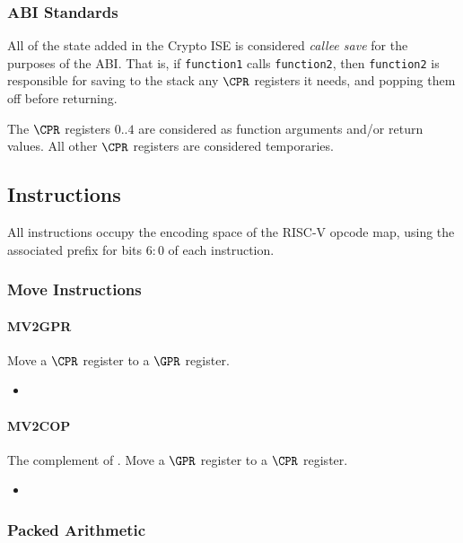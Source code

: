 \subsubsection{ABI Standards}

All of the state added in the Crypto ISE is considered {\em callee save}
for the purposes of the ABI. That is, if {\tt function1} calls 
{\tt function2}, then {\tt function2} is responsible for saving to the
stack any $\CPR$ registers it needs, and popping them off before returning.

The $\CPR$ registers $0..4$ are considered as function arguments
and/or return values. 
All other $\CPR$ registers are considered temporaries.

\subsection{Instructions}

All instructions occupy the \encspace encoding space of the RISC-V opcode
map, using the associated \encopcode prefix for bits $6:0$ of each 
instruction.

\subsubsection{Move Instructions}
\paragraph{MV2GPR}

Move a $\CPR$ register to a $\GPR$ register.

\begin{itemize}
\item {}
\end{itemize}


\paragraph{MV2COP}

The complement of .
Move a $\GPR$ register to a $\CPR$ register.

\begin{itemize}
\item {}
\end{itemize}

\subsubsection{Packed Arithmetic}
